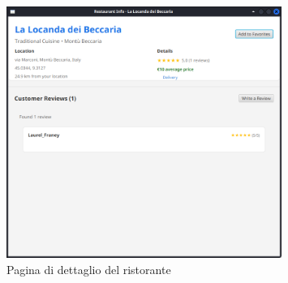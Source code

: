 \begin{figure}[H]
    \centering
    \includegraphics[width=0.8\textwidth]{images/restaurant.png}
    \caption{Pagina di dettaglio del ristorante}
    \label{fig:restaurant}
\end{figure}
